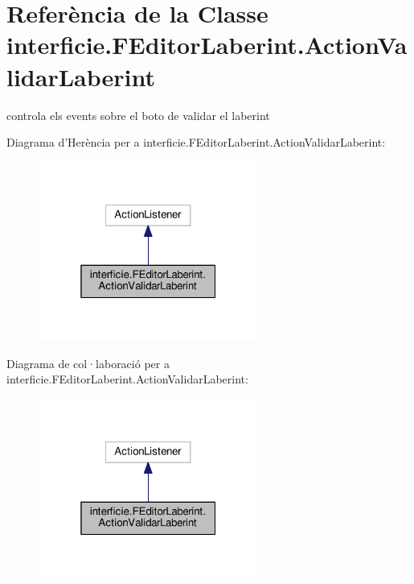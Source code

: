 \hypertarget{classinterficie_1_1_f_editor_laberint_1_1_action_validar_laberint}{\section{Referència de la Classe interficie.\+F\+Editor\+Laberint.\+Action\+Validar\+Laberint}
\label{classinterficie_1_1_f_editor_laberint_1_1_action_validar_laberint}
}


controla els events sobre el boto de validar el laberint  




Diagrama d'Herència per a interficie.\+F\+Editor\+Laberint.\+Action\+Validar\+Laberint\+:
\nopagebreak
\begin{figure}[H]
\begin{center}
\leavevmode
\includegraphics[width=205pt]{classinterficie_1_1_f_editor_laberint_1_1_action_validar_laberint__inherit__graph}
\end{center}
\end{figure}


Diagrama de col·laboració per a interficie.\+F\+Editor\+Laberint.\+Action\+Validar\+Laberint\+:
\nopagebreak
\begin{figure}[H]
\begin{center}
\leavevmode
\includegraphics[width=205pt]{classinterficie_1_1_f_editor_laberint_1_1_action_validar_laberint__coll__graph}
\end{center}
\end{figure}
